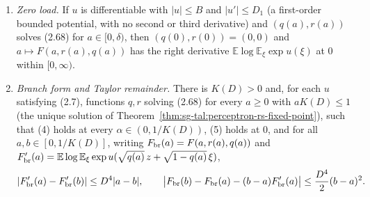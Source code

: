 \begin{proposition}
\begin{enumerate}
\item \emph{Zero load.} If $u$ is differentiable with $|u|\le B$ and $|u'|\le D_1$ (a first-order
bounded potential, with no second or third derivative) and $(q(a),r(a))$ solves (2.68) for
$a\in[0,\delta)$, then $(q(0),r(0))=(0,0)$ and $a\mapsto F(a,r(a),q(a))$ has the right derivative
$\mathbb E\log\mathbb E_\xi\exp u(\xi)$ at $0$ within $[0,\infty)$.
\item \emph{Branch form and Taylor remainder.} There is $K(D)>0$ and, for each $u$ satisfying (2.7),
functions $q,r$ solving (2.68) for every $a\ge0$ with $aK(D)\le1$ (the unique solution of
Theorem~\ref{thm:sg-tal:perceptron-rs-fixed-point}), such that (4) holds at every $\alpha\in(0,1/K(D))$,
(5) holds at $0$, and for all $a,b\in[0,1/K(D)]$, writing $F_{\rm br}(a)=F(a,r(a),q(a))$ and
$F'_{\rm br}(a)=\mathbb E\log\mathbb E_\xi\exp u(\sqrt{q(a)}\,z+\sqrt{1-q(a)}\,\xi)$,
\[
 |F'_{\rm br}(a)-F'_{\rm br}(b)|\le D^4|a-b|,\qquad
 \bigl|F_{\rm br}(b)-F_{\rm br}(a)-(b-a)F'_{\rm br}(a)\bigr|\le\frac{D^4}{2}(b-a)^2 .
\]
\end{enumerate}
\end{proposition}
